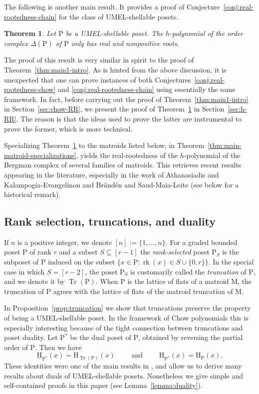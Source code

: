 \documentclass[11pt,a4paper]{amsart}
\theoremstyle{results}
\newtheorem{maintheorem}[thm]{Theorem}
\theoremstyle{definitions}
\def\P{\mathbb{P}}
\newcommand{\uH}{\underline{\mathrm{H}}}
\newcommand{\Tr}{\operatorname{Tr}}
\newcommand{\trunc}{\Tr}
\newcommand{\rk}{\operatorname{rk}}
\newcommand{\M}{\mathrm{M}}
\renewcommand{\P}{\mathrm{P}}
\renewcommand{\H}{\mathrm{H}}
\begin{document}
The following is another main result. It provides a proof of Conjecture~\ref{conj:real-rootedness-chain} for the class of UMEL-shellable posets.

\begin{maintheorem}
\label{thm:main2-intro}
    Let $\P$ be a UMEL-shellable poset. The $h$-polynomial of the order complex $\Delta(\P)$ of $\P$ only has real and nonpositive roots.
\end{maintheorem}

The proof of this result is very similar in spirit to the proof of Theorem~\ref{thm:main1-intro}. As is hinted from the above discussion, it is unexpected that one can prove instances of both Conjectures~\ref{conj:real-rootedness-chow} and \ref{conj:real-rootedness-chain} using essentially the same framework. In fact, before carrying out the proof of Theorem~\ref{thm:main1-intro} in Section~\ref{sec:chow-RR}, we present the proof of Theorem~\ref{thm:main2-intro} in Section~\ref{sec:h-RR}. The reason is that the ideas used to prove the latter are instrumental to prove the former, which is more technical.

Specializing Theorem~\ref{thm:main2-intro} to the matroids listed below, in Theorem~\ref{thm:main-matroid-specializations}, yields the real-rootedness of the $h$-polynomial of the Bergman complex of several families of matroids. This retrieves recent results appearing in the literature, especially in the work of Athanasiadis and Kalampogia-Evangelinou \cite{athanasiadis-kalampogia} and Br\"and\'en and Saud-Maia-Leite \cite{branden-saud1,branden-saud2} (see below for a historical remark). 


\subsection{Rank selection, truncations, and duality}

If $n$ is a positive integer, we denote $[n] := \{1,\ldots,n\}$. For a graded bounded poset $\P$ of rank $r$ and a subset $S\subseteq [r-1]$ the \emph{rank-selected} poset $\P_S$ is the subposet of $\P$ induced on the subset $\{x\in \P: \rk(x)\in S\cup\{0,r\}\}$. In the special case in which $S = [r-2]$, the poset $\P_S$ is customarily called the \emph{truncation} of $\P$, and we denote it by $\trunc(\P)$. When $\P$ is the lattice of flats of a matroid $\M$, the truncation of $\P$ agrees with the lattice of flats of the matroid truncation of $\M$. 

In Proposition~\ref{prop:truncation} we show that truncations preserve the property of being a UMEL-shellable poset. In the framework of Chow polynomials this is especially interesting because of the tight connection between truncations and poset duality. Let $\P^{\ast}$ be the dual poset of $\P$, obtained by reversing the partial order of $\P$. Then we have 
\[ \uH_{\P^*}(x) = \H_{\trunc(\P)}(x) \qquad \text{ and } \qquad \H_{\P^*}(x) = \H_{\P}(x). \]
These identities were one of the main results in \cite[Theorem~1.2 and Corollary~4.2]{branden-vecchi1}, and allow us to derive many results about duals of UMEL-shellable posets. Nonetheless we give simple and self-contained proofs in this paper (see Lemma~\ref{lemma:duality}).
\end{document}
